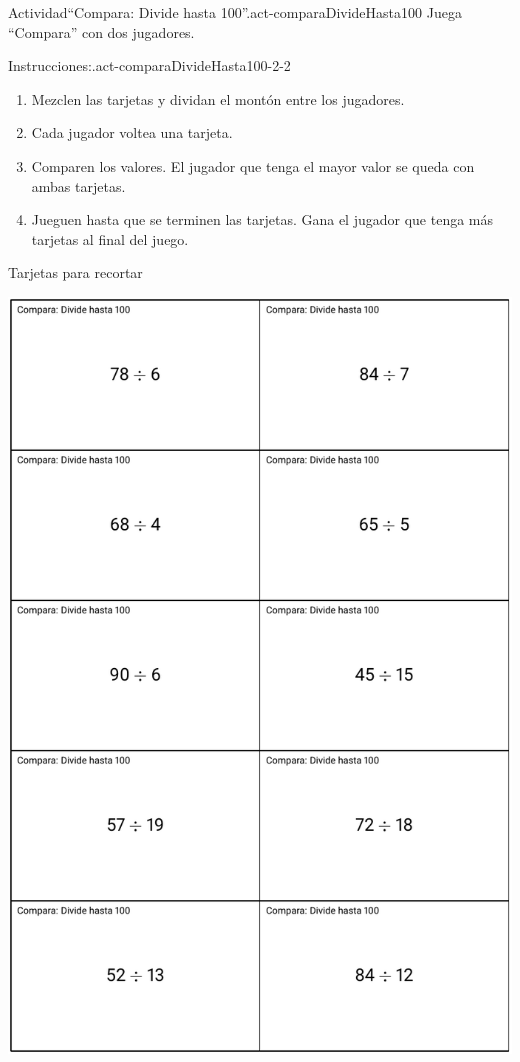 \documentclass[14pt]{extarticle}
\begin{document}
\begin{activity}{Actividad}{“Compara: Divide hasta 100”.}{act-comparaDivideHasta100}%
Juega ``Compara'' con dos jugadores.%
\begin{paragraphs}{Instrucciones:.}{act-comparaDivideHasta100-2-2}%
%
\begin{enumerate}
\item{}Mezclen las tarjetas y dividan el montón entre los jugadores.%
\item{}Cada jugador voltea una tarjeta.%
\item{}Comparen los valores. El jugador que tenga el mayor valor se queda con ambas tarjetas.%
\item{}Jueguen hasta que se terminen las tarjetas. Gana el jugador que tenga más tarjetas al final del juego.%
\end{enumerate}
\end{paragraphs}%
\end{activity}
\clearpage
\fancyhead[L]{}
Tarjetas para recortar%
\begin{image}{0}{1}{0}{}%
\includegraphics[max width=\linewidth, center]{external/blm/tikz-source/act-comparaDivideHasta100-tarjetas-grandes1.pdf}
\end{image}%
\end{document}
